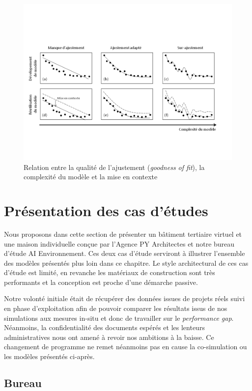 \begin{figure}[H]
\centering
\includegraphics[scale=0.62]{Images/ComplexityAndContextualization}
\caption{Relation entre la qualité de l'ajustement (\textit{goodness of fit}), la complexité du modèle et la mise en contexte}
\label{fig:Fit-to-purpose}
\end{figure}

\section{Présentation des cas d'études}

Nous proposons dans cette section de présenter un bâtiment tertiaire virtuel et une maison individuelle conçue par l'Agence PY Architectes et notre bureau d'étude AI Environnement. Ces deux cas d'étude serviront à illustrer l'ensemble des modèles présentés plus loin dans ce chapitre. Le style architectural de ces cas d'étude est limité, en revanche les matériaux de construction sont très performants et la conception est proche d'une démarche passive.

Notre volonté initiale était de récupérer des données issues de projets réels suivi en phase d'exploitation afin de pouvoir comparer les résultats issus de nos simulations aux mesures in-situ et donc de travailler sur le \textit{performance gap}. Néanmoins, la confidentialité des documents espérés et les lenteurs administratives nous ont amené à revoir nos ambitions à la baisse. Ce changement de programme ne remet néanmoins pas en cause la co-simulation ou les modèles présentés ci-après.

\subsection{Bureau}

